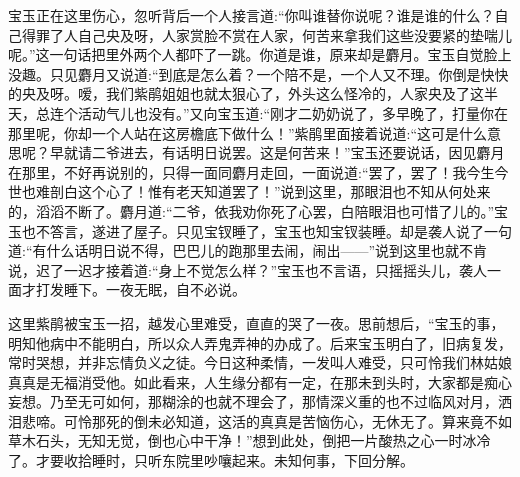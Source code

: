 \begin{parag}
    宝玉正在这里伤心，忽听背后一个人接言道:“你叫谁替你说呢？谁是谁的什么？自己得罪了人自己央及呀，人家赏脸不赏在人家，何苦来拿我们这些没要紧的垫喘儿呢。”这一句话把里外两个人都吓了一跳。你道是谁，原来却是麝月。宝玉自觉脸上没趣。只见麝月又说道:“到底是怎么着？一个陪不是，一个人又不理。你倒是快快的央及呀。嗳，我们紫鹃姐姐也就太狠心了，外头这么怪冷的，人家央及了这半天，总连个活动气儿也没有。”又向宝玉道:“刚才二奶奶说了，多早晚了，打量你在那里呢，你却一个人站在这房檐底下做什么！”紫鹃里面接着说道:“这可是什么意思呢？早就请二爷进去，有话明日说罢。这是何苦来！”宝玉还要说话，因见麝月在那里，不好再说别的，只得一面同麝月走回，一面说道:“罢了，罢了！我今生今世也难剖白这个心了！惟有老天知道罢了！”说到这里，那眼泪也不知从何处来的，滔滔不断了。麝月道:“二爷，依我劝你死了心罢，白陪眼泪也可惜了儿的。”宝玉也不答言，遂进了屋子。只见宝钗睡了，宝玉也知宝钗装睡。却是袭人说了一句道:“有什么话明日说不得，巴巴儿的跑那里去闹，闹出——”说到这里也就不肯说，迟了一迟才接着道:“身上不觉怎么样？”宝玉也不言语，只摇摇头儿，袭人一面才打发睡下。一夜无眠，自不必说。
\end{parag}


\begin{parag}
    这里紫鹃被宝玉一招，越发心里难受，直直的哭了一夜。思前想后，“宝玉的事，明知他病中不能明白，所以众人弄鬼弄神的办成了。后来宝玉明白了，旧病复发，常时哭想，并非忘情负义之徒。今日这种柔情，一发叫人难受，只可怜我们林姑娘真真是无福消受他。如此看来，人生缘分都有一定，在那未到头时，大家都是痴心妄想。乃至无可如何，那糊涂的也就不理会了，那情深义重的也不过临风对月，洒泪悲啼。可怜那死的倒未必知道，这活的真真是苦恼伤心，无休无了。算来竟不如草木石头，无知无觉，倒也心中干净！”想到此处，倒把一片酸热之心一时冰冷了。才要收拾睡时，只听东院里吵嚷起来。未知何事，下回分解。
\end{parag}